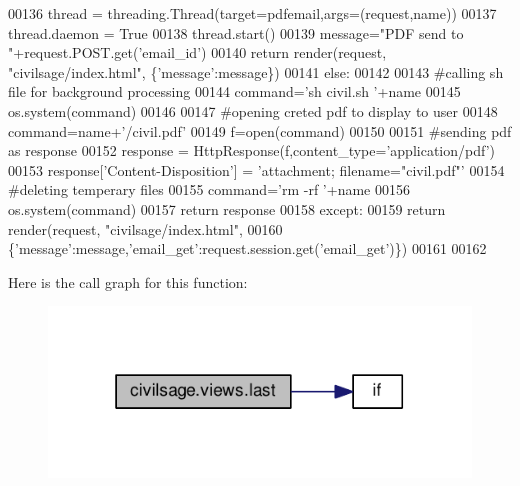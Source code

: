 \begin{DoxyCode}
00136             thread = threading.Thread(target=pdfemail,args=(request,name))
00137             thread.daemon = \textcolor{keyword}{True}
00138             thread.start()
00139             message=\textcolor{stringliteral}{"PDF send to "}+request.POST.get(\textcolor{stringliteral}{'email\_id'})
00140             \textcolor{keywordflow}{return} render(request, \textcolor{stringliteral}{"civilsage/index.html"}, \{\textcolor{stringliteral}{'message'}:message\})
00141         \textcolor{keywordflow}{else}:
00142 
00143             \textcolor{comment}{#calling sh file for background processing}
00144             command=\textcolor{stringliteral}{'sh  civil.sh '}+name
00145             os.system(command)
00146 
00147             \textcolor{comment}{#opening creted pdf to display to user}
00148             command=name+\textcolor{stringliteral}{'/civil.pdf'}
00149             f=open(command)
00150 
00151             \textcolor{comment}{#sending pdf as response}
00152             response = HttpResponse(f,content\_type=\textcolor{stringliteral}{'application/pdf'})
00153             response[\textcolor{stringliteral}{'Content-Disposition'}] = \textcolor{stringliteral}{'attachment; filename="civil.pdf"'}
00154             \textcolor{comment}{#deleting temperary files}
00155             command=\textcolor{stringliteral}{'rm -rf '}+name
00156             os.system(command)
00157             \textcolor{keywordflow}{return} response
00158     \textcolor{keywordflow}{except}:
00159         \textcolor{keywordflow}{return} render(request, \textcolor{stringliteral}{"civilsage/index.html"},
00160         \{\textcolor{stringliteral}{'message'}:message,\textcolor{stringliteral}{'email\_get'}:request.session.get(\textcolor{stringliteral}{'email\_get'})\})
00161 
00162 
\end{DoxyCode}


Here is the call graph for this function\+:\nopagebreak
\begin{figure}[H]
\begin{center}
\leavevmode
\includegraphics[width=322pt]{namespacecivilsage_1_1views_aed47fb0740a2fa14693f697905788719_cgraph}
\end{center}
\end{figure}


